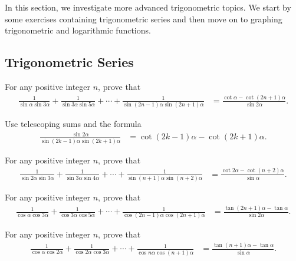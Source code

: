 In this section, we investigate more advanced trigonometric topics. We start by some exercises containing trigonometric series and then move on to graphing trigonometric and logarithmic functions.

\subsection{Trigonometric Series}


\begin{question}
    For any positive integer $n$, prove that
    \begin{align*}
        \frac{1}{\sin \alpha \sin 3\alpha}+\frac{1}{\sin 3\alpha \sin 5\alpha}+\cdots+\frac{1}{\sin (2n-1)\alpha \sin (2n+1)\alpha}&= \frac{\cot \alpha - \cot(2n+1)\alpha}{\sin 2\alpha}.
    \end{align*}
\end{question}

\begin{solution}
    Use telescoping sums and the formula
    \begin{align*}
        \frac{\sin 2 \alpha}{\sin (2k-1)\alpha \sin (2k+1)\alpha} &=\cot(2k-1)\alpha - \cot(2k+1)\alpha.
    \end{align*}
\end{solution}

\begin{question}
    For any positive integer $n$, prove that
    \begin{align*}
        \frac{1}{\sin 2\alpha \sin 3\alpha}+\frac{1}{\sin 3\alpha \sin 4\alpha}+\cdots+\frac{1}{\sin (n+1)\alpha \sin (n+2)\alpha} &= \frac{\cot 2\alpha - \cot(n+2)\alpha}{\sin \alpha}.
    \end{align*}
\end{question}

\begin{question}
    For any positive integer $n$, prove that
    \begin{align*}
        \frac{1}{\cos \alpha \cos 3\alpha}+\frac{1}{\cos 3\alpha \cos 5\alpha}+\cdots+\frac{1}{\cos (2n-1)\alpha \cos (2n+1)\alpha}&= \frac{\tan(2n+1)\alpha - \tan\alpha}{\sin 2\alpha}.
    \end{align*}
\end{question}

\begin{question}
    For any positive integer $n$, prove that
    \begin{align*}
        \frac{1}{\cos \alpha \cos 2\alpha}+\frac{1}{\cos 2\alpha \cos 3\alpha}+\cdots+\frac{1}{\cos n\alpha \cos (n+1)\alpha}&= \frac{\tan(n+1)\alpha - \tan\alpha}{\sin \alpha}.
    \end{align*}
\end{question}


